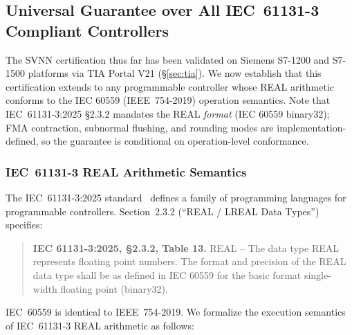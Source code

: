 \subsection{Universal Guarantee over All IEC~61131-3 Compliant Controllers}
\label{sec:iec-universal}

The SVNN certification thus far has been validated on Siemens S7-1200 and
S7-1500 platforms via TIA Portal V21 ({\S}\ref{sec:tia}). We now establish
that this certification extends to any programmable controller whose REAL
arithmetic conforms to the IEC 60559 (IEEE~754-2019) operation semantics.
Note that IEC~61131-3:2025 \S2.3.2 mandates the REAL \textit{format} (IEC
60559 binary32); FMA contraction, subnormal flushing, and rounding modes
are implementation-defined, so the guarantee is conditional on
operation-level conformance.

\subsubsection{IEC~61131-3 REAL Arithmetic Semantics}

The IEC~61131-3:2025 standard~\cite{iec61131-3_2025} defines a family of
programming languages for programmable controllers. Section~2.3.2
(``REAL / LREAL Data Types'') specifies:

\begin{quote}
\small
\textbf{IEC 61131-3:2025, \S 2.3.2, Table 13.}
REAL -- The data type REAL represents floating point numbers. The format
and precision of the REAL data type shall be as defined in IEC 60559 for
the basic format single-width floating point (binary32).
\end{quote}

IEC~60559 is identical to IEEE~754-2019. We formalize the execution
semantics of IEC~61131-3 REAL arithmetic as follows:

